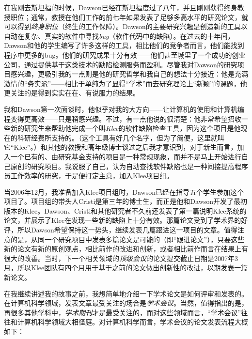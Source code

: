 \documentclass[letter,12pt]{book}
\begin{document}
\begin{CJK}{UTF8}{gbsn}
在我刚去斯坦福的时候，Dawson已经在斯坦福度过了八年，并且刚刚获得终身教授职位；通常，教授在他们工作的前七年如果发表了足够多高水平的研究论文，就可以得到\emph{终身职位}（终生的工作保障）。Dawson的主要研究兴趣是创造新的工具以自动在复杂、真实的软件中寻找\emph{bug}（软件代码中的缺陷）。在过去的十年间，Dawson和他的学生编写了许多这样的工具，相比他们的竞争者而言，他们能找到程序中更多的bug。他们的研究成果十分有效——他们甚至城里了一个成功的创业公司，通过提供基于这类技术的缺陷检测服务而盈利。尽管我对Dawson的研究项目感兴趣，更吸引我的一点则是他的研究哲学和我自己的想法十分接近：他是充满激情的“务实派”——相比于单纯为了显得“学术”而去研究理论上“新颖”的课题，他更关注的是得到实实在在、有说服力的结果。

我和Dawson第一次面谈时，他似乎对我的大方向——让计算机的使用和计算机编程变得更高效——只是稍感兴趣。不过，有一点他说的很清楚：他非常希望招收一些新的研究生来帮助他完成一个叫\emph{Klee}的软件缺陷检查工具，因为这个项目是他现在的科研经费所支持的。（这个工具有好几个名字，但为了简便，这里就叫它“Klee”。）和其他的教授和高年级博士谈过之后我才意识到，对于新生而言，加入一个已有的、由研究基金支持的项目是一种常规现象，而并不是马上开始进行自己原创的研究项目。我说服了自己，认为自动查找软件缺陷也是一种间接提高程序员工作效率的研究，于是便打定主意，加入Klee项目组。

当2006年12月，我准备加入Klee项目组时，Dawson已经在指导五个学生参加这个项目了。项目组的带头人Cristi是第三年的博士生，而正是他和Dawson开发了最初版本的Klee。Dawson、Cristi和其他研究者不久前还发表了第一篇说明Klee系统的论文，并展示了Klee在发现一些新的缺陷上十分有效。那篇论文受到了学术界的好评，所以Dawson希望保持这一势头，继续发表几篇跟进这一项目的文章。值得注意的是，从同一个研究项目中发表多篇论文是可能的（即“跟进论文”），只要这些新的论文有新的原创观点，相比前作的改进和创新，或者相比前作而言在结果上有很大的改善。当时，下一个相关领域的\emph{顶级会议}的论文提交截止日期是2007年3月，所以Klee团队有四个月用于基于之前的论文做出创新性的改进，以期发表一篇新论文。

\breakline

在我继续讲述我的故事之前，我想简单地介绍一下学术论文是如何评审和发表的。在计算机科学领域，发表文章最受关注的场合是\emph{学术会议}。当然，值得指出的是，再很多其他学科中，\emph{学术期刊}才是最受关注的，而对这些领域而言，“学术会议”往往和计算机科学领域大相径庭。对计算机科学而言，学术会议的论文发表流程大概如下：


\end{CJK}
\end{document}

